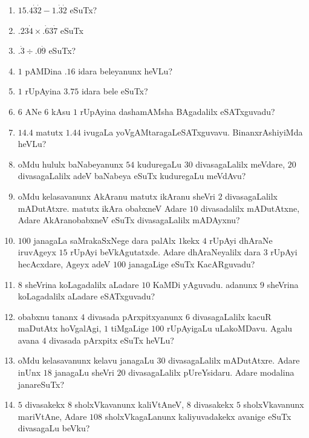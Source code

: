 \begin{enumerate}
\item $15.4\dot 3\dot 2- 1. \dot 3\dot 2$ eSuTx?

\item $. 23\dot4 \times .\dot 63\dot 7$ eSuTx

\item $.\dot 3\div .0\dot 9$ eSuTx?

\item $1$ pAMDina $.16$ idara beleyanunx heVLu?

\item $1$ rUpAyina $3.75$ idara bele eSuTx?

\item $6$ ANe $6$ kAsu $1$ rUpAyina dashamAMsha BAgadalilx
eSATxguvadu?

\item $14.4$ matutx $1.44$ ivugaLa
yoVgAMtaragaLeSATxguvavu. BinanxrAshiyiMda heVLu?

\item oMdu hululx baNabeyanunx $54$ kuduregaLu $30$ divasagaLalilx
meVdare, $20$ divasagaLalilx adeV baNabeya eSuTx kuduregaLu meVdAvu?

\item oMdu kelasavanunx AkAranu matutx ikAranu sheVri $2$
divasagaLalilx mADutAtxre. matutx ikAra obabxneV Adare $10$
divasadalilx mADutAtxne, Adare AkAranobabxneV eSuTx divasagaLalilx
mADAyxnu?

\item $100$ janagaLa saMrakaSxNege dara palAlx $1$kekx $4$ rUpAyi
dhAraNe iruvAgeyx $15$ rUpAyi beVkAgutatxde. Adare dhAraNeyalilx dara
$3$ rUpAyi hecAcxdare, Ageyx adeV $100$ janagaLige eSuTx KacARguvadu?

\item $8$ sheVrina koLagadalilx aLadare $10$ KaMDi yAguvadu. adanunx
$9$ sheVrina koLagadalilx aLadare eSATxguvadu?

\item obabxnu tananx $4$ divasada pArxpitxyanunx $6$ divasagaLalilx
kacuR maDutAtx hoVgalAgi, $1$ tiMgaLige $100$ rUpAyigaLu
uLakoMDavu. Agalu avana $4$ divasada pArxpitx eSuTx heVLu?

\item oMdu kelasavanunx kelavu janagaLu $30$ divasagaLalilx
mADutAtxre. Adare inUnx $18$ janagaLu sheVri $20$ divasagaLalilx
pUreYsidaru. Adare modalina janareSuTx?

\item $5$ divasakekx $8$ sholxVkavanunx kaliVtAneV, $8$ divasakekx $5$
sholxVkavanunx mariVtAne, Adare $108$ sholxVkagaLanunx kaliyuvadakekx
avanige eSuTx divasagaLu beVku?


\end{enumerate}
